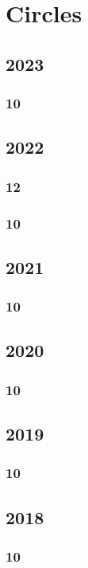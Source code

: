 \documentclass[11pt]{book}
\begin{document}
\chapter{Circles}
\section{2023}
\subsection{10}

\section{2022}
\subsection{12}

\subsection{10}


\section{2021}
\subsection{10}

\section{2020}
\subsection{10}

\section{2019} 
\subsection{10}

\section{2018} 
\subsection{10}

\end{document}
